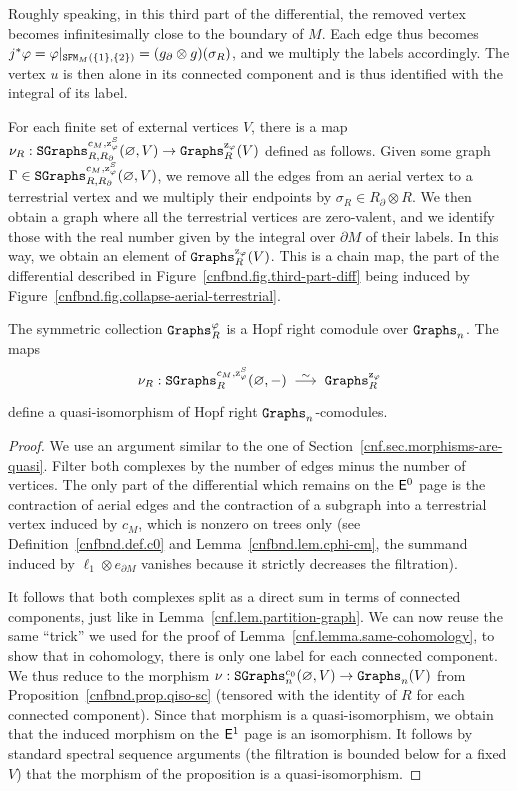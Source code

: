 Roughly speaking, in this third part of the differential, the removed vertex becomes infinitesimally close to the boundary of $M$.
Each edge thus becomes $j^{*}\varphi = \varphi|_{\mathtt{SFM}_{M}(\{1\},\{2\})} = (g_{\partial} \otimes g)(\sigma_{R})$, and we multiply the labels accordingly.
The vertex $u$ is then alone in its connected component and is thus identified with the integral of its label.

For each finite set of external vertices $V$, there is a map $\nu_{R} : \mathtt{SGraphs}^{c_{M}, \mathrm{z}^{S}_{\varphi}}_{R, R_{\partial}}(\varnothing, V) \to \mathtt{Graphs}^{\mathrm{z}_{\varphi}}_{R}(V)$ defined as follows.
Given some graph $\Gamma \in \mathtt{SGraphs}^{c_{M}, \mathrm{z}^{S}_{\varphi}}_{R, R_{\partial}}(\varnothing, V)$, we remove all the edges from an aerial vertex to a terrestrial vertex and we multiply their endpoints by $\sigma_{R} \in R_{\partial} \otimes R$.
We then obtain a graph where all the terrestrial vertices are zero-valent, and we identify those with the real number given by the integral over $\partial M$ of their labels.
In this way, we obtain an element of $\mathtt{Graphs}^{\mathrm{z}_{\varphi}}_{R}(V)$.
This is a chain map, the part of the differential described in Figure~\ref{cnfbnd.fig.third-part-diff} being induced by Figure~\ref{cnfbnd.fig.collapse-aerial-terrestrial}.

\begin{proposition}
  The symmetric collection $\mathtt{Graphs}^{\varphi}_{R}$ is a Hopf right co\-mo\-dule over $\mathtt{Graphs}_{n}$.
  The maps
  \[ \nu_{R} : \SGraphs^{c_{M},\szphi}_{R}(\varnothing, -) \qiso \Graphs^{\zphi}_{R} \]
  define a quasi-iso\-mor\-phism of Hopf right $\mathtt{Graphs}_{n}$-comodules.
\end{proposition}
\begin{proof}
  We use an argument similar to the one of Section~\ref{cnf.sec.morphisms-are-quasi}.
  Filter both complexes by the number of edges minus the number of vertices.
  The only part of the differential which remains on the $\mathsf{E}^{0}$ page is the contraction of aerial edges and the contraction of a subgraph into a terrestrial vertex induced by $c_{M}$, which is nonzero on trees only (see Definition~\ref{cnfbnd.def.c0} and Lemma~\ref{cnfbnd.lem.cphi-cm}, the summand induced by $\ell_1 \otimes e_{\partial M}$ vanishes because it strictly decreases the filtration).

  It follows that both complexes split as a direct sum in terms of connected components, just like in Lemma~\ref{cnf.lem.partition-graph}.
  We can now reuse the same ``trick'' we used for the proof of Lemma~\ref{cnf.lemma.same-cohomology}, to show that in cohomology, there is only one label for each connected component.
  We thus reduce to the morphism $\nu : \mathtt{SGraphs}^{c_{0}}_{n}(\varnothing, V) \to \mathtt{Graphs}_{n}(V)$ from Proposition~\ref{cnfbnd.prop.qiso-sc} (tensored with the identity of $R$ for each connected component).
  Since that morphism is a quasi-isomorphism, we obtain that the induced morphism on the $\mathsf{E}^{1}$ page is an isomorphism.
  It follows by standard spectral sequence arguments (the filtration is bounded below for a fixed $V$) that the morphism of the proposition is a quasi-isomorphism.
\end{proof}

